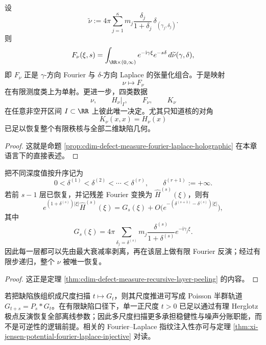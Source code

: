 \begin{proposition}[二维指纹的张量分解与唯一性]\label{prop:typed-address-biaxial-completion-comoving-fingerprint}
设
\[
\widetilde\nu:=
4\pi\sum_{j=1}^{\kappa}m_j\frac{\delta_j}{1+\delta_j}\,\delta_{(\gamma_j,\delta_j)}.
\]
则
\[
F_\nu(\xi,s)=
\int_{\RR\times(0,\infty)}
e^{-\mathrm{i}\gamma\xi}e^{-s\delta}\,d\widetilde\nu(\gamma,\delta),
\]
即 \(F_\nu\) 正是 \(\gamma\)-方向 Fourier 与 \(\delta\)-方向 Laplace 的张量化组合。于是映射
\[
\nu\longmapsto F_\nu
\]
在有限测度类上为单射。更进一步，四类数据
\[
\nu,\qquad H_\nu|_I,\qquad F_\nu,\qquad K_\nu
\]
在任意非空开区间 \(I\subset\RR\) 上彼此唯一决定。尤其只知道核的对角
\[
K_\nu(x,x)=H_\nu(x)
\]
已足以恢复整个有限秩核与全部二维缺陷几何。
\end{proposition}
\begin{proof}
这就是命题 \ref{prop:cdim-defect-measure-fourier-laplace-holographic} 在本章语言下的直接表述。
\end{proof}

\begin{theorem}[有限缺陷测度的递归层剥离]\label{thm:typed-address-biaxial-completion-comoving-layer-peeling}
把不同深度值按升序记为
\[
0<\delta^{(1)}<\delta^{(2)}<\cdots<\delta^{(r)},
\qquad
\delta^{(r+1)}:=+\infty.
\]
若前 \(s-1\) 层已恢复，并记残差 Fourier 变换为 \(\widehat H^{(s)}(\xi)\)，则有
\[
e^{(1+\delta^{(s)})|\xi|}\widehat H^{(s)}(\xi)
=
G_s(\xi)+
O\!\bigl(e^{-(\delta^{(s+1)}-\delta^{(s)})|\xi|}\bigr),
\]
其中
\[
G_s(\xi)=
4\pi\sum_{\delta_j=\delta^{(s)}}
m_j\frac{\delta^{(s)}}{1+\delta^{(s)}}e^{-\mathrm{i}\gamma_j\xi}.
\]
因此每一层都可以先由最大衰减率剥离，再在该层上做有限 Fourier 反演；经过有限步递归，整个 \(\nu\) 被唯一恢复。
\end{theorem}
\begin{proof}
这正是定理 \ref{thm:cdim-defect-measure-recursive-layer-peeling} 的内容。
\end{proof}

\begin{remark}\label{rem:typed-address-biaxial-completion-comoving-poisson}
若把缺陷族组织成尺度扫描 \(t\mapsto G_t\)，则其尺度推进可写成 Poisson 半群轨道 \(G_{t+s}=P_s*G_t\)。在有限缺陷口径下，单一正尺度 \(t>0\) 已足以通过有理 Herglotz 极点反演恢复全部离线参数；因此多尺度扫描更多承担稳健性与噪声分账职能，而不是可逆性的逻辑前提。相关的 Fourier--Laplace 指纹注入性亦可与定理 \ref{thm:xi-jensen-potential-fourier-laplace-injective} 对读。
\end{remark}

